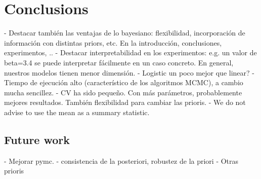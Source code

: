 %
%

\chapter{Conclusions}\label{ch:conclusions}

\begin{outcomment}
  - Destacar también las ventajas de lo bayesiano: flexibilidad, incorporación de información con distintas priors, etc. En la introducción, conclusiones, experimentos, ..
- Destacar interpretabilidad en los experimentos: e.g. un valor de beta=3.4 se puede interpretar fácilmente en un caso concreto. En general, nuestros modelos tienen menor dimensión.
- Logistic un poco mejor que linear?
- Tiempo de ejecución alto (característico de los algoritmos MCMC), a cambio mucha sencillez.
- CV ha sido pequeño. Con más parámetros, probablemente mejores resultados. También flexibilidad para cambiar las prioris.
- We do not advise to use the mean as a summary statistic.
\end{outcomment}

\section{Future work}


\begin{outcomment}
  - Mejorar pymc.
  - consistencia de la posteriori, robustez de la priori
  - Otras prioris

\end{outcomment}

